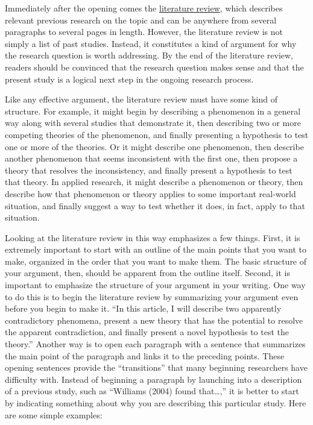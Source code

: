 \documentclass[
]{krantz}
\begin{document}
Immediately after the opening comes the \protect\hyperlink{literature-review}{literature review}, which describes relevant previous research on the topic and can be anywhere from several paragraphs to several pages in length. However, the literature review is not simply a list of past studies. Instead, it constitutes a kind of argument for why the research question is worth addressing. By the end of the literature review, readers should be convinced that the research question makes sense and that the present study is a logical next step in the ongoing research process.

Like any effective argument, the literature review must have some kind of structure. For example, it might begin by describing a phenomenon in a general way along with several studies that demonstrate it, then describing two or more competing theories of the phenomenon, and finally presenting a hypothesis to test one or more of the theories. Or it might describe one phenomenon, then describe another phenomenon that seems inconsistent with the first one, then propose a theory that resolves the inconsistency, and finally present a hypothesis to test that theory. In applied research, it might describe a phenomenon or theory, then describe how that phenomenon or theory applies to some important real-world situation, and finally suggest a way to test whether it does, in fact, apply to that situation.

Looking at the literature review in this way emphasizes a few things. First, it is extremely important to start with an outline of the main points that you want to make, organized in the order that you want to make them. The basic structure of your argument, then, should be apparent from the outline itself. Second, it is important to emphasize the structure of your argument in your writing. One way to do this is to begin the literature review by summarizing your argument even before you begin to make it. ``In this article, I will describe two apparently contradictory phenomena, present a new theory that has the potential to resolve the apparent contradiction, and finally present a novel hypothesis to test the theory.'' Another way is to open each paragraph with a sentence that summarizes the main point of the paragraph and links it to the preceding points. These opening sentences provide the ``transitions'' that many beginning researchers have difficulty with. Instead of beginning a paragraph by launching into a description of a previous study, such as ``Williams (2004) found that\ldots,'' it is better to start by indicating something about why you are describing this particular study. Here are some simple examples:
\end{document}
